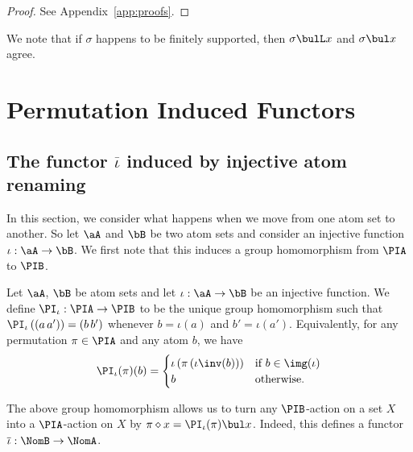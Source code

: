 \documentclass[twoside,11pt]{entics}
\begin{document}
\begin{proof}
  See Appendix~\ref{app:proofs}.
\end{proof}

We note that if $\sigma$ happens to be finitely supported, then
$\sigma\bulL x$ and $\sigma\bul x$ agree.

\section{Permutation Induced Functors}

\subsection{The functor $\overline{\iota}$ induced by injective atom renaming}
\label{ssec:overline-iota}

In this section, we consider what happens when we move from one atom
set to another. So let $\aA$ and $\bB$ be two atom sets and consider
an injective function $\iota:\aA\to\bB$. We first note that this induces
a group homomorphism from $\PIA$ to $\PIB$.

\begin{xdefinition}\label{def:PIA-iota}
  Let $\aA$, $\bB$ be atom sets and let $\iota:\aA\to\bB$ be an injective
  function. We define $\PI_\iota:\PIA \to \PIB$ to be the unique
  group homomorphism such that $\PI_\iota \left( (a\,a') \right)=(b\,b')$
  whenever $b=\iota(a)$ and $b'=\iota(a')$. Equivalently, for any permutation
  $\pi\in \PIA$ and any atom $b$, we have
  \[
  \PI_\iota(\pi) (b)=
  \begin{cases} \iota\left( \pi\left( \iota\inv (b) \right)\right) &
    \text{if } b\in \img(\iota)\\ b & \text{otherwise.}
  \end{cases}
  \]
\end{xdefinition}

The above group homomorphism allows us to turn any $\PIB$-action
on a set $X$ into a $\PIA$-action on $X$ by $\pi\diamond x=
\PI_\iota(\pi)\bul x$. Indeed, this defines a functor
$\overline{\iota}:\NomB\to\NomA$.
\end{document}
